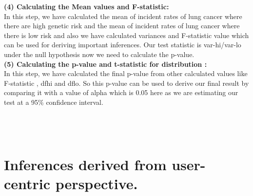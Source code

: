 \documentclass{article}
\begin{document}
\begin{enumerate}
\begin{figure}[htbp]
		\end{figure}	

		
		\textbf{(4) Calculating the Mean values and F-statistic:} \\ 
		In this step, we have calculated the mean of incident rates of lung cancer where there are high genetic risk and the mean of incident rates of lung cancer where there is low risk and also we have calculated variances and F-statistic value which can be used for deriving important inferences.  Our test statistic is var-hi/var-lo under the null hypothesis now we need to calculate the p-value. \\ 
		\textbf{(5) Calculating the p-value and t-statistic for distribution :
		} \\
		In this step, we have calculated the final p-value from other calculated values like F-statistic , dfhi and dflo. So this p-value can be used to derive our final result by comparing it with a value of alpha which is 0.05 here as we are estimating our test at a 95\% confidence interval. \\ \\ 
		\\ \\
		
		
	\end{enumerate}
	
	
	
	\section{Inferences derived from user-centric perspective.}
	
\end{document}
